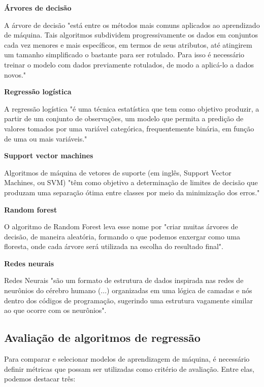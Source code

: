 		    \textbf{Árvores de decisão}\par
		    A árvore de decisão "está entre os métodos mais comuns aplicados ao aprendizado de máquina. Tais algoritmos subdividem progressivamente os dados em conjuntos cada vez menores e mais específicos, em termos de seus atributos, até atingirem um tamanho simplificado o bastante para ser rotulado. Para isso é necessário treinar o modelo com dados previamente rotulados, de modo a aplicá-lo a dados novos." \cite{digitalhouse2021}

		    \textbf{Regressão logística}\par
		    A regressão logística "é uma técnica estatística que tem como objetivo produzir, a partir de um conjunto de observações, um modelo que permita a predição de valores tomados por uma variável categórica, frequentemente binária, em função de uma ou mais variáveis." \cite{gonzalez2018}
		    
		    \textbf{Support vector machines}\par
		     Algoritmos de máquina de vetores de suporte (em inglês, Support Vector Machines, ou SVM) "têm como objetivo a determinação de limites de decisão que produzam uma separação ótima entre classes por meio da minimização dos erros." \cite{nascimento2009}
		    
		    \textbf{Random forest}\par
		    O algoritmo de Random Forest leva esse nome por "criar muitas árvores de decisão, de maneira aleatória, formando o que podemos enxergar como uma floresta, onde cada árvore será utilizada na escolha do resultado final". \cite{didatica2019}
		    
		    
		    \textbf{Redes neurais}\par
		    Redes Neurais "são um formato de estrutura de dados inspirada nas redes de neurônios do cérebro humano (...) organizadas em uma lógica de camadas e nós dentro dos códigos de programação, sugerindo uma estrutura vagamente similar ao que ocorre com os neurônios".\cite{ilumeo2020}
		    
	    \subsection{Avaliação de algoritmos de regressão}
	    Para comparar e selecionar modelos de aprendizagem de máquina, é necessário definir métricas que possam ser utilizadas como critério de avaliação. Entre elas, podemos destacar três:\par
	

